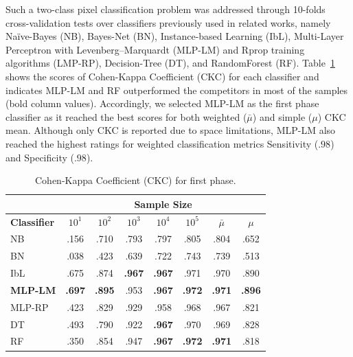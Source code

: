 Such a two-class pixel classification problem was addressed through 10-folds cross-validation tests over classifiers previously used in related works, namely Na\"{i}ve-Bayes (NB), Bayes-Net (BN), Instance-based Learning (IbL), Multi-Layer Perceptron with Levenberg--Marquardt (MLP-LM) and Rprop training algorithms (LMP-RP), Decision-Tree (DT), and RandomForest (RF).
Table~\ref{tab:classifiers} shows the scores of Cohen-Kappa Coefficient (CKC) for each classifier and indicates MLP-LM and RF outperformed the competitors in most of the samples (bold column values).
Accordingly, we selected MLP-LM as the \system first phase classifier as it reached the best scores for both weighted ($\bar{\mu}$) and simple ($\mu$) CKC mean.
Although only CKC is reported due to space limitations, MLP-LM also reached the highest ratings for weighted classification metrics Sensitivity ($.98$) and Specificity ($.98$).
\vspace{-10px}

\begin{table}[!htb]
\centering
\caption{Cohen-Kappa Coefficient (CKC) for \system first phase.}
\vspace{-5px}
\label{tab:classifiers}
\begin{tabular}{l|c|c|c|c|c||c|c} \hline \hline
 & 
\multicolumn{7}{c}{ {\cellcolor[HTML]{68CBD0}\textbf{Sample Size}} }    \\ \hline
\cellcolor[HTML]{68CBD0} \textbf{Classifier} & 
\cellcolor[HTML]{68CBD0} \textbf{$10^1$}  & 
\cellcolor[HTML]{68CBD0} \textbf{$10^2$}  & 
\cellcolor[HTML]{68CBD0} \textbf{$10^3$}  & 
\cellcolor[HTML]{68CBD0} \textbf{$10^4$}  & 
\cellcolor[HTML]{68CBD0} \textbf{$10^5$}  &
\cellcolor[HTML]{68CBD0} \textbf{$\bar{\mu}$} &
\cellcolor[HTML]{68CBD0} \textbf{$\mu$}\\ \hline \hline
NB         & .156 & .710 & .793 & .797 & .805  & .804 & .652 \\ \hline
BN         & .038 & .423 & .639 & .722 & .743  & .739 & .513 \\ \hline
IbL        & .675 & .874 & \textbf{.967} & \textbf{.967} & .971 & .970 & .890\\ \hline
\textbf{MLP-LM} & \textbf{.697} & \textbf{.895} & .953 & \textbf{.967} & \textbf{.972} & \textbf{.971} & \textbf{.896} \\ \hline
MLP-RP     & .423 & .829 & .929 & .958 & .968  & .967 & .821 \\ \hline
DT         & .493 & .790 & .922 & \textbf{.967} & .970  & .969 & .828 \\ \hline
RF         & .350 & .854 & .947 & \textbf{.967} & \textbf{.972} & \textbf{.971} & .818\\ \hline \hline
\end{tabular}
\end{table}

